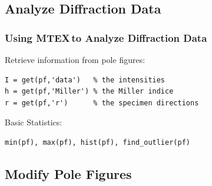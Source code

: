 \documentclass{beamer}
\newcommand{\MTEX}{{\bf {\color{red}M}TEX\,}}%
\begin{document}
\subsection*{Analyze Diffraction Data}

\begin{frame}[fragile]
  \frametitle{Using \MTEX to Analyze Diffraction Data}



Retrieve information from pole figures:
\begin{lstlisting}
I = get(pf,'data')   % the intensities
h = get(pf,'Miller') % the Miller indice
r = get(pf,'r')      % the specimen directions
\end{lstlisting}

Basic Statistics:
\begin{lstlisting}
min(pf), max(pf), hist(pf), find_outlier(pf)
\end{lstlisting}


\end{frame}

\subsection*{Modify Pole Figures}
\end{document}

